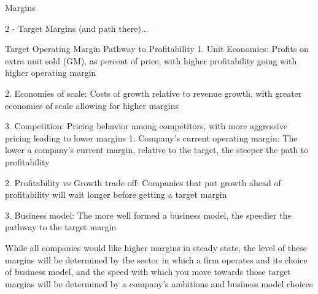 \documentclass[10pt]{article}
\begin{document}
    \begin{core}{Margins}

      2 - Target Margins (and path there)...

      Target Operating Margin
      Pathway to Profitability
      1. Unit Economics: Profits on extra unit sold (GM), as percent of price, with higher profitability going with higher operating margin

      2. Economies of scale: Costs of growth relative to revenue growth, with greater economies of scale allowing for higher margins

      3. Competition: Pricing behavior among competitors, with more aggressive pricing leading to lower margins
      1. Company’s current operating margin: The lower a company’s current margin, relative to the target, the steeper the path to profitability

      2. Profitability vs Growth trade off: Companies that put growth ahead of profitability will wait longer before getting a target margin

      3. Business model: The more well formed a business model, the speedier the pathway to the target margin

      While all companies would like higher margins in steady state, the level of these margins will be determined by the sector in which a firm operates and its choice of business model, and the speed with which you move towards those target margins will be determined by a company’s ambitions and business model choices 

    \end{core}
\end{document}
